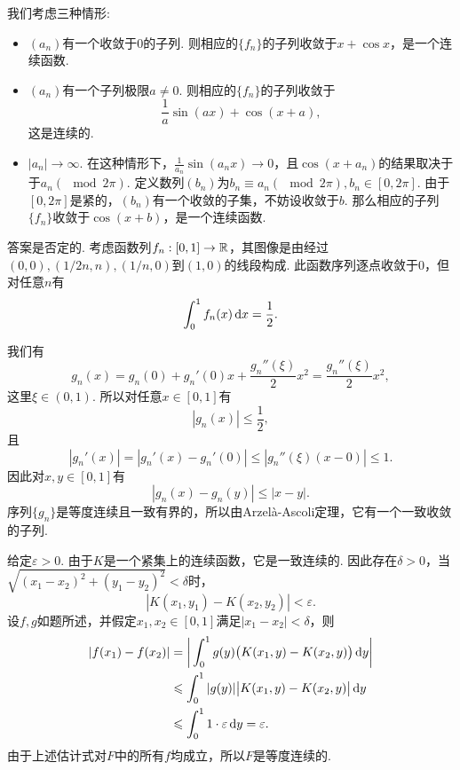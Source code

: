 \begin{ans}
  我们考虑三种情形:
  \begin{itemize}
    \item $(a_n)$有一个收敛于0的子列. 则相应的$\{f_n\}$的子列收敛于$x+\cos x$，是一个连续函数.
    \item $(a_n)$有一个子列极限$a\ne0$. 则相应的$\{f_n\}$的子列收敛于
        \[ \frac1a\sin(ax)+\cos(x+a), \]
        这是连续的.
    \item $|a_n|\to\infty$. 在这种情形下，$\frac1{a_n}\sin(a_n x)\to 0$，且$\cos(x+a_n)$的结果取决于于$a_n(\mod2\pi)$. 定义数列$(b_n)$为$b_n\equiv a_n(\mod2\pi),b_n\in[0,2\pi]$. 由于$[0,2\pi]$是紧的，$(b_n)$有一个收敛的子集，不妨设收敛于$b$. 那么相应的子列$\{f_n\}$收敛于$\cos(x+b)$，是一个连续函数.
  \end{itemize}
\end{ans}

\begin{ans}
  答案是否定的. 考虑函数列$f_n:[0,1]\to\mathbb R$，其图像是由经过$(0,0),(1/2n,n),(1/n,0)$到$(1,0)$的线段构成. 此函数序列逐点收敛于0，但对任意$n$有
  \[ \int_0^1f_n(x)\,\mathrm dx=\frac12. \]
  \begin{figure}[!ht]
    \centering
  \end{figure}
\end{ans}

\begin{ans}
  我们有
  \[
    g_n(x)=g_n(0)+g_n'(0)x+\frac{g_n''(\xi)}2x^2
    = \frac{g_n''(\xi)}2x^2,
  \]
  这里$\xi\in(0,1)$. 所以对任意$x\in[0,1]$有
  \[ |g_n(x)|\le\frac12, \]
  且
  \[
    |g_n'(x)|=|g_n'(x)-g_n'(0)|\le
    |g_n''(\xi)(x-0)|\le1.
  \]
  因此对$x,y\in[0,1]$有
  \[ |g_n(x)-g_n(y)|\le|x-y|. \]
  序列$\{g_n\}$是等度连续且一致有界的，所以由Arzel\`a-Ascoli定理，它有一个一致收敛的子列.
\end{ans}

\begin{ans}
  给定$\varepsilon>0$. 由于$K$是一个紧集上的连续函数，它是一致连续的. 因此存在$\delta>0$，当$\sqrt{(x_1-x_2)^2+(y_1-y_2)^2}<\delta$时，
  \[ |K(x_1,y_1)-K(x_2,y_2)|<\varepsilon. \]
  设$f,g$如题所述，并假定$x_1,x_2\in[0,1]$满足$|x_1-x_2|<\delta$，则
  \begin{align*}
    |f(x_1)-f(x_2)| & = \bigg| \int_0^1g(y)
    \big(K(x_1,y)-K(x_2,y)\big)\,\mathrm dy \bigg|\\
    & \leqslant \int_0^1|g(y)|\big| K(x_1,y)-K(x_2,y) \big|\,\mathrm dy\\
    & \leqslant \int_0^11\cdot\varepsilon\,\mathrm dy = \varepsilon.
  \end{align*}
  由于上述估计式对$F$中的所有$f$均成立，所以$F$是等度连续的.
\end{ans}

